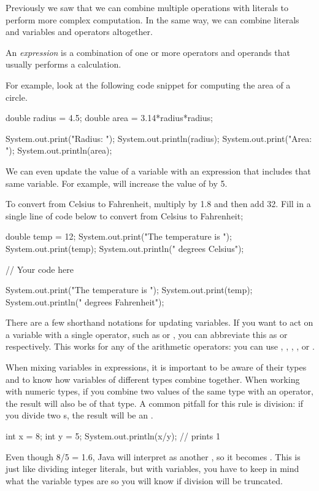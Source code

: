 Previously we saw that we can combine multiple operations with literals to perform more complex computation. In the same way, we can combine literals and variables and operators altogether.
\begin{definition}
An \emph{expression} is a combination of one or more operators and operands that usually performs a calculation.
\end{definition}
For example, look at the following code snippet for computing the area of a circle.
\begin{code}
  double radius = 4.5;
  double area = 3.14*radius*radius;

  System.out.print("Radius: ");
  System.out.println(radius);
  System.out.print("Area: ");
  System.out.println(area);
\end{code}

We can even update the value of a variable with an expression that includes that same variable. For example,  will increase the value of  by 5.

\begin{exercise}
  To convert from Celsius to Fahrenheit, multiply by 1.8 and then add 32. Fill in a single line of code below to convert  from Celsius to Fahrenheit;

  \begin{code}
    double temp = 12;
    System.out.print("The temperature is ");
    System.out.print(temp);
    System.out.println(" degrees Celsius");

    // Your code here

    System.out.print("The temperature is ");
    System.out.print(temp);
    System.out.println(" degrees Fahrenheit");
  \end{code}
\end{exercise}

There are a few shorthand notations for updating variables. If you want to act on a variable  with a single operator, such as  or , you can abbreviate this as  or  respectively. This works for any of the arithmetic operators: you can use \ic{+=}, \ic{-=}, \ic{*=}, \ic{/=}, or \ic{\%=}.

When mixing variables in expressions, it is important to be aware of their types and to know how variables of different types combine together. When working with numeric types, if you combine two values of the same type with an operator, the result will also be of that type. A common pitfall for this rule is division: if you divide two s, the result will be an .
\begin{code}
  int x = 8;
  int y = 5;
  System.out.println(x/y); // prints 1
\end{code}
Even though 8/5 = 1.6, Java will interpret  as another , so it becomes . This is just like dividing integer literals, but with variables, you have to keep in mind what the variable types are so you will know if division will be truncated.

